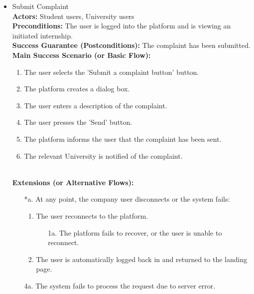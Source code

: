 \begin{itemize}[label={[\textbf{UC}]}, align=left, leftmargin=*]
    \item {} Submit Complaint \\
    \textbf{Actors:} Student users, University users\\
     \textbf{Preconditions:} The user is logged into the platform and is viewing an initiated internship.\\
     \textbf{Success Guarantee (Postconditions):} The complaint has been submitted. \\
     \textbf{Main Success Scenario (or Basic Flow):} 
     \begin{enumerate}[label=\arabic*.] 
        \item The user selects the 'Submit a complaint button' button.
        \item The platform creates a dialog box.
        \item The user enters a description of the complaint.
        \item The user presses the 'Send' button.
        \item The platform informs the user that the complaint has been sent.
        \item The relevant University is notified of the complaint.
     \end{enumerate} \\

    \textbf{Extensions (or Alternative Flows):} 
    \begin{enumerate}[label=\arabic*.]
        \item[*a.] At any point, the company user disconnects or the system fails:
            \begin{enumerate}[label=\arabic*.]
                \item The user reconnects to the platform.
                    \begin{enumerate}[label=\alph*.]
                        \item[1a.] The platform fails to recover, or the user is unable to reconnect.
                    \end{enumerate}
                 \item The user is automatically logged back in and returned to the landing page.
            \end{enumerate} 
        \item[4a.] The system fails to process the request due to server error.
        \end{enumerate}



\end{itemize}
